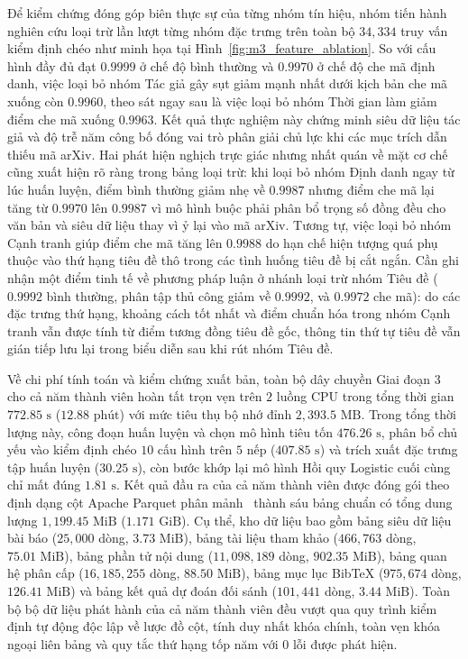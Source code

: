 Để kiểm chứng đóng góp biên thực sự của từng nhóm tín hiệu, nhóm tiến hành nghiên cứu loại trừ lần lượt từng nhóm đặc trưng trên toàn bộ $34{,}334$ truy vấn kiểm định chéo như minh họa tại Hình~\ref{fig:m3_feature_ablation}. So với cấu hình đầy đủ đạt $0.9999$ ở chế độ bình thường và $0.9970$ ở chế độ che mã định danh, việc loại bỏ nhóm Tác giả gây sụt giảm mạnh nhất dưới kịch bản che mã xuống còn $0.9960$, theo sát ngay sau là việc loại bỏ nhóm Thời gian làm giảm điểm che mã xuống $0.9963$. Kết quả thực nghiệm này chứng minh siêu dữ liệu tác giả và độ trễ năm công bố đóng vai trò phân giải chủ lực khi các mục trích dẫn thiếu mã arXiv. Hai phát hiện nghịch trực giác nhưng nhất quán về mặt cơ chế cũng xuất hiện rõ ràng trong bảng loại trừ: khi loại bỏ nhóm Định danh ngay từ lúc huấn luyện, điểm bình thường giảm nhẹ về $0.9987$ nhưng điểm che mã lại tăng từ $0.9970$ lên $0.9987$ vì mô hình buộc phải phân bổ trọng số đồng đều cho văn bản và siêu dữ liệu thay vì ỷ lại vào mã arXiv. Tương tự, việc loại bỏ nhóm Cạnh tranh giúp điểm che mã tăng lên $0.9988$ do hạn chế hiện tượng quá phụ thuộc vào thứ hạng tiêu đề thô trong các tình huống tiêu đề bị cắt ngắn. Cần ghi nhận một điểm tinh tế về phương pháp luận ở nhánh loại trừ nhóm Tiêu đề ($0.9992$ bình thường, phân tập thủ công giảm về $0.9992$, và $0.9972$ che mã): do các đặc trưng thứ hạng, khoảng cách tốt nhất và điểm chuẩn hóa trong nhóm Cạnh tranh vẫn được tính từ điểm tương đồng tiêu đề gốc, thông tin thứ tự tiêu đề vẫn gián tiếp lưu lại trong biểu diễn sau khi rút nhóm Tiêu đề.

Về chi phí tính toán và kiểm chứng xuất bản, toàn bộ dây chuyền Giai đoạn 3 cho cả năm thành viên hoàn tất trọn vẹn trên $2$ luồng CPU trong tổng thời gian $772.85\text{ s}$ ($12.88\text{ phút}$) với mức tiêu thụ bộ nhớ đỉnh $2{,}393.5\text{ MB}$. Trong tổng thời lượng này, công đoạn huấn luyện và chọn mô hình tiêu tốn $476.26\text{ s}$, phân bổ chủ yếu vào kiểm định chéo $10$ cấu hình trên $5$ nếp ($407.85\text{ s}$) và trích xuất đặc trưng tập huấn luyện ($30.25\text{ s}$), còn bước khớp lại mô hình Hồi quy Logistic cuối cùng chỉ mất đúng $1.81\text{ s}$. Kết quả đầu ra của cả năm thành viên được đóng gói theo định dạng cột Apache Parquet phân mảnh~\cite{apache_parquet} thành sáu bảng chuẩn có tổng dung lượng $1{,}199.45\text{ MiB}$ ($1.171\text{ GiB}$). Cụ thể, kho dữ liệu bao gồm bảng siêu dữ liệu bài báo ($25{,}000$ dòng, $3.73\text{ MiB}$), bảng tài liệu tham khảo ($466{,}763$ dòng, $75.01\text{ MiB}$), bảng phần tử nội dung ($11{,}098{,}189$ dòng, $902.35\text{ MiB}$), bảng quan hệ phân cấp ($16{,}185{,}255$ dòng, $88.50\text{ MiB}$), bảng mục lục BibTeX ($975{,}674$ dòng, $126.41\text{ MiB}$) và bảng kết quả dự đoán đối sánh ($101{,}441$ dòng, $3.44\text{ MiB}$). Toàn bộ bộ dữ liệu phát hành của cả năm thành viên đều vượt qua quy trình kiểm định tự động độc lập về lược đồ cột, tính duy nhất khóa chính, toàn vẹn khóa ngoại liên bảng và quy tắc thứ hạng tốp năm với $0$ lỗi được phát hiện.

